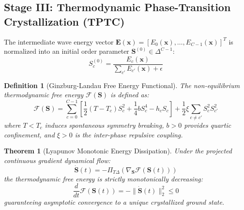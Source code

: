 \documentclass[journal,twoside]{IEEEtran}
\newtheorem{theorem}{Theorem}
\newtheorem{definition}{Definition}
\theoremstyle{remark}
\begin{document}
\subsection{Stage III: Thermodynamic Phase-Transition Crystallization (TPTC)}
The intermediate wave energy vector $\mathbf{E}(\mathbf{x}) = [E_0(\mathbf{x}), \dots, E_{C-1}(\mathbf{x})]^T$ is normalized into an initial order parameter $\mathbf{S}^{(0)} \in \Delta^{C-1}$:
\begin{equation}
    S_c^{(0)} = \frac{E_c(\mathbf{x})}{\sum_{c'} E_{c'}(\mathbf{x}) + \epsilon}
\end{equation}

\begin{definition}[Ginzburg-Landau Free Energy Functional]
The non-equilibrium thermodynamic free energy $\mathcal{F}(\mathbf{S})$ is defined as:
\begin{equation}
    \mathcal{F}(\mathbf{S}) = \sum_{c=0}^{C-1} \left[ \frac{1}{2} (T - T_c) S_c^2 + \frac{1}{4} b S_c^4 - h_c S_c \right] + \frac{1}{2} \xi \sum_{c \ne c'} S_c^2 S_{c'}^2
\end{equation}
where $T < T_c$ induces spontaneous symmetry breaking, $b > 0$ provides quartic confinement, and $\xi > 0$ is the inter-phase repulsive coupling.
\end{definition}

\begin{theorem}[Lyapunov Monotonic Energy Dissipation]
Under the projected continuous gradient dynamical flow:
\begin{equation}
    \dot{\mathbf{S}}(t) = -\Pi_{T\Delta} \left( \nabla_{\mathbf{S}} \mathcal{F}(\mathbf{S}(t)) \right)
\end{equation}
the thermodynamic free energy is strictly monotonically decreasing:
\begin{equation}
    \frac{d}{dt} \mathcal{F}(\mathbf{S}(t)) = -\|\dot{\mathbf{S}}(t)\|_2^2 \le 0
\end{equation}
guaranteeing asymptotic convergence to a unique crystallized ground state.
\end{theorem}
\end{document}
